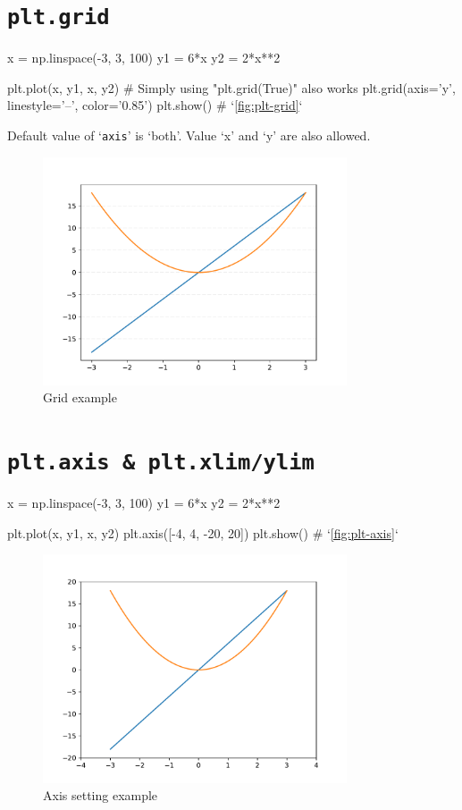 \documentclass{report}
\begin{document}
\section{\texttt{plt.grid}} 
\begin{py}
x = np.linspace(-3, 3, 100)
y1 = 6*x
y2 = 2*x**2

plt.plot(x, y1, x, y2)
# Simply using "plt.grid(True)" also works
plt.grid(axis='y', linestyle='--', color='0.85')
plt.show() # `\autoref{fig:plt-grid}`
\end{py}

Default value of `\texttt{axis}' is `both'. Value `x' and `y' are also allowed.

\begin{figure}[!htb]
  \centering
  \includegraphics[width=90mm]{plt-grid}
  \caption{Grid example}
  \label{fig:plt-grid}
\end{figure}

\section{\texttt{plt.axis \& plt.xlim/ylim}}
\begin{py}
x = np.linspace(-3, 3, 100)
y1 = 6*x
y2 = 2*x**2

plt.plot(x, y1, x, y2)
plt.axis([-4, 4, -20, 20])
plt.show() # `\autoref{fig:plt-axis}`
\end{py}

\begin{figure}[!htb]
  \centering
  \includegraphics[width=90mm]{plt-axis}
  \caption{Axis setting example}
  \label{fig:plt-axis}
\end{figure}
\end{document}
